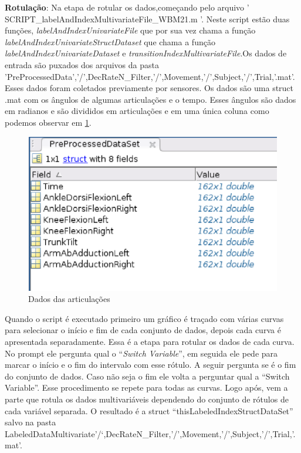  \begin{itemize}

  \begin{sloppypar}

  \item \textbf{Rotulação}: Na etapa de rotular os dados,começando pelo arquivo
  ' SCRIPT\_labelAndIndexMultivariateFile\_WBM21.m '. Neste script estão duas funções,
  \textit{labelAndIndexUnivariateFile} que por sua vez chama a função
  \textit{labelAndIndexUnivariateStructDataset} que chama a função \textit{labelAndIndexUnivariateDataset}
  e \textit{transitionIndexMultivariateFile}.Os dados de entrada são puxados dos arquivos da pasta
  'PreProcessedData','/',DecRateN\_Filter,'/',Movement,'/',Subject,'/',Trial,'.mat'.
  Esses dados foram coletados previamente por sensores. Os dados são uma struct .mat
  com  os ângulos de algumas articulações e o tempo. Esses ângulos são dados em radianos
   e são divididos em articulações e em uma única coluna como podemos observar em \ref{structMatlab}.

  \begin{figure}[!h]
  \centering
  \includegraphics [keepaspectratio=true,scale=0.60]{figuras/structMatlab.eps}
  \caption{Dados das articulações}
  \label{structMatlab}
  \end{figure}

    Quando o script é executado  primeiro um gráfico é traçado com várias curvas
   para selecionar o início e fim de cada conjunto de dados,
  depois cada curva é apresentada separadamente. Essa é a etapa para rotular os
  dados de cada curva. No prompt ele pergunta qual o “\textit{Switch Variable}”, em seguida
   ele pede para marcar  o início e o fim do intervalo com esse rótulo. A seguir
  pergunta se é o fim do  conjunto de dados. Caso não seja o fim ele volta a
   perguntar qual a “Switch Variable”. Esse procedimento se repete para todas as curvas.
  Logo após, vem a parte que rotula os dados multivariáveis dependendo do conjunto
  de rótulos de cada variável separada. O resultado é a struct “thisLabeledIndexStructDataSet” salvo na pasta
  LabeledDataMultivariate’/‘,DecRateN\_Filter,'/',Movement,'/',Subject,'/',Trial,'.mat'.


\end{sloppypar}
\end{itemize}
